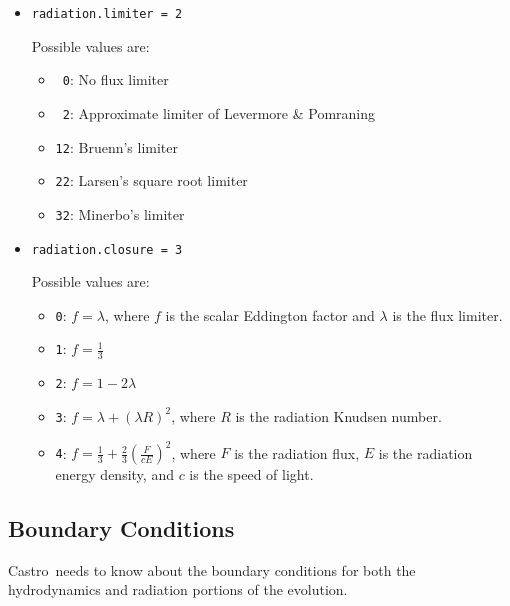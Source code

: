 \documentclass[11pt,letterpaper]{article}
\newcommand{\castro}{{\sf Castro}}
\begin{document}
\begin{itemize}

\item {\tt radiation.limiter = 2}

  Possible values are:
  \begin{itemize}
  \item {\tt ~0}: No flux limiter

  \item {\tt ~2}: Approximate limiter of Levermore \& Pomraning

  \item {\tt 12}: Bruenn's limiter

  \item {\tt 22}: Larsen's square root limiter

  \item {\tt 32}: Minerbo's limiter
  \end{itemize}

\item {\tt radiation.closure = 3}

  Possible values are:
  \begin{itemize}
  \item {\tt 0}: $f = \lambda$, where $f$ is the scalar Eddington factor
    and $\lambda$ is the flux limiter.

  \item {\tt 1}: $f = \frac{1}{3}$
  \item {\tt 2}: $f = 1 - 2 \lambda$
  \item {\tt 3}: $f = \lambda + (\lambda R)^2$, where $R$ is the radiation
    Knudsen number.
  \item {\tt 4}: $f = \frac{1}{3} + \frac{2}{3} (\frac{F}{cE})^2$, where
      $F$ is the radiation flux, $E$ is the radiation energy density,
      and $c$ is the speed of light.
  \end{itemize}
\end{itemize}


\subsection{Boundary Conditions}

\castro\ needs to know about the boundary conditions for both
the hydrodynamics and radiation portions of the evolution.
\end{document}
